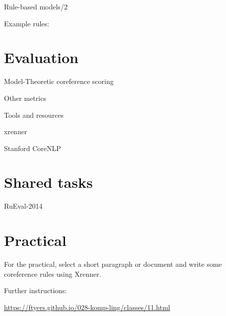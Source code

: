 \documentclass[dvipsnames, 10pt, compress]{beamer}
\begin{document}
\begin{frame}{Rule-based models/2} %

Example rules:



\end{frame}


\section{Evaluation}


\begin{frame}{Model-Theoretic coreference scoring}


\end{frame}

\begin{frame}{Other metrics}


\end{frame}

\begin{frame}{Tools and resources}


\end{frame}

\begin{frame}{xrenner}

\end{frame}

\begin{frame}{Stanford CoreNLP}

\end{frame}


\section{Shared tasks}

\begin{frame}{RuEval-2014}

\end{frame}

\section{Practical}

For the practical, select a short paragraph or document and write some coreference rules 
using Xrenner.

Further instructions:

\url{https://ftyers.github.io/028-komp-ling/classes/11.html}
\end{document}
